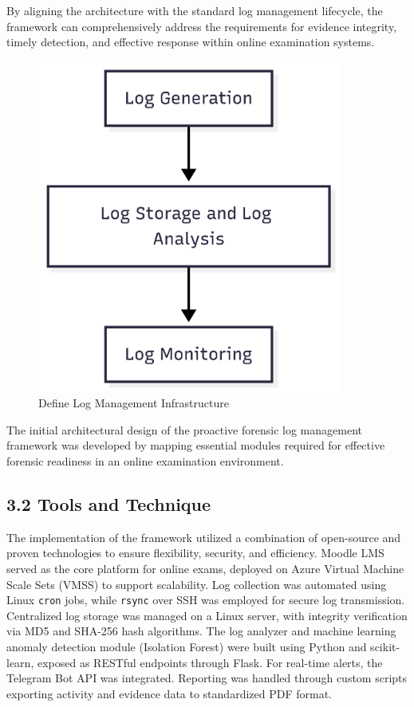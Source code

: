 By aligning the architecture with the standard log management lifecycle, the framework can comprehensively address the requirements for evidence integrity, timely detection, and effective response within online examination systems.
\begin{figure}[H] 
	\centering
	\includegraphics[width=10cm]{figure/subphase-3.1-define-architecture.png}
	\caption{Define Log Management Infrastructure}
	\label{fig:lm-infrastructure}
\end{figure}
The initial architectural design of the proactive forensic log management framework was developed by mapping essential modules required for effective forensic readiness in an online examination environment. 

\subsection{3.2 Tools and Technique}

The implementation of the framework utilized a combination of open-source and proven technologies to ensure flexibility, security, and efficiency. Moodle LMS served as the core platform for online exams, deployed on Azure Virtual Machine Scale Sets (VMSS) to support scalability. Log collection was automated using Linux \texttt{cron} jobs, while \texttt{rsync} over SSH was employed for secure log transmission. Centralized log storage was managed on a Linux server, with integrity verification via MD5 and SHA-256 hash algorithms. The log analyzer and machine learning anomaly detection module (Isolation Forest) were built using Python and scikit-learn, exposed as RESTful endpoints through Flask. For real-time alerts, the Telegram Bot API was integrated. Reporting was handled through custom scripts exporting activity and evidence data to standardized PDF format.

